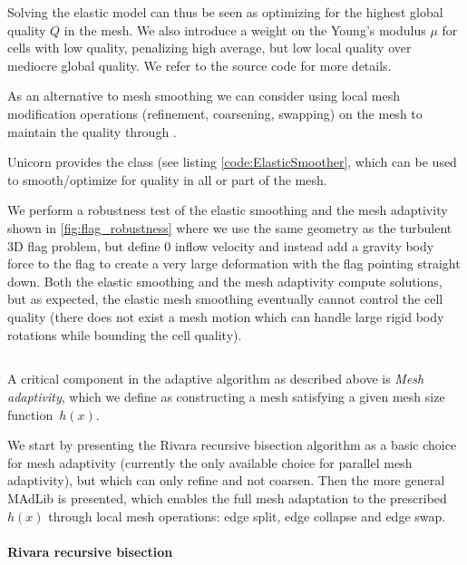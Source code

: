 Solving the elastic model can thus be seen as optimizing for the highest
global quality $Q$ in the mesh. We also introduce a weight on the Young's
modulus $\mu$ for cells with low quality, penalizing high average, but
low local quality over mediocre global quality. We refer to the source
code for more details.

As an alternative to mesh smoothing we can consider using local mesh
modification operations (refinement, coarsening, swapping) on the mesh
to maintain the quality \citep{Comp`ereRemacleJanssonEtAl2009} through
.

Unicorn provides the  class (see listing
\ref{code:ElasticSmoother}, which can be used to smooth/optimize for
quality in all or part of the mesh.

We perform a robustness test of the elastic smoothing and the mesh
adaptivity shown in \ref{fig:flag_robustness} where we use the same
geometry as the turbulent 3D flag problem, but define 0 inflow velocity
and instead add a gravity body force to the flag to create a very large
deformation with the flag pointing straight down. Both the elastic
smoothing and the mesh adaptivity compute solutions, but as expected,
the elastic mesh smoothing eventually cannot control the cell quality
(there does not exist a mesh motion which can handle large rigid body
rotations while bounding the cell quality).

\subsection{}

A critical component in the adaptive algorithm as described above is
{\em Mesh adaptivity}, which we define as constructing a mesh satisfying
a given mesh size function~$h(x)$.

We start by presenting the Rivara recursive bisection algorithm
\citep{Rivara1992} as a basic choice for mesh adaptivity (currently
the only available choice for parallel mesh adaptivity), but which can
only refine and not coarsen. Then the more general MAdLib is presented,
which enables the full mesh adaptation to the prescribed $h(x)$ through
local mesh operations: edge split, edge collapse and edge swap.

\paragraph{Rivara recursive bisection}

